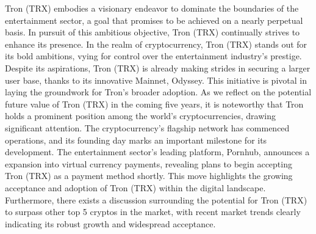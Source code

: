 \begin{tcolorbox}[title = {Case 2}, colframe=darkgreen, colback=lightgray, breakable]
Tron (TRX) embodies a visionary endeavor to dominate the boundaries of the entertainment sector, a goal that promises to be achieved on a nearly perpetual basis. In pursuit of this ambitious objective, Tron (TRX) continually strives to enhance its presence. In the realm of cryptocurrency, Tron (TRX) stands out for its bold ambitions, vying for control over the entertainment industry's prestige. Despite its aspirations, Tron (TRX) is already making strides in securing a larger user base, thanks to its innovative Mainnet, Odyssey. This initiative is pivotal in laying the groundwork for Tron's broader adoption. As we reflect on the potential future value of Tron (TRX) in the coming five years, it is noteworthy that Tron holds a prominent position among the world's cryptocurrencies, drawing significant attention. The cryptocurrency's flagship network has commenced operations, and its founding day marks an important milestone for its development. The entertainment sector's leading platform, Pornhub, announces a expansion into virtual currency payments, revealing plans to begin accepting Tron (TRX) as a payment method shortly. This move highlights the growing acceptance and adoption of Tron (TRX) within the digital landscape. Furthermore, there exists a discussion surrounding the potential for Tron (TRX) to surpass other top 5 cryptos in the market, with recent market trends clearly indicating its robust growth and widespread acceptance.
\end{tcolorbox}

